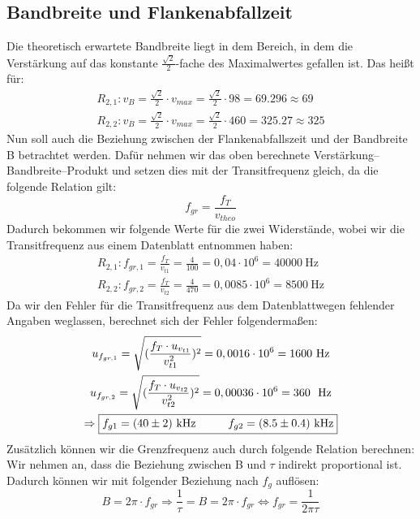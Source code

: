 \subsection*{Bandbreite und Flankenabfallzeit}
Die theoretisch erwartete Bandbreite liegt in dem Bereich, in dem die Verstärkung auf das konstante $\frac{\sqrt{2}}{2}$-fache des Maximalwertes gefallen ist. Das heißt für:
\begin{gather}
    R_{2,1}: v_B=\frac{\sqrt{2}}{2}\cdot v_{max}=\frac{\sqrt{2} }{2}\cdot 98=69.296\approx 69\\
    R_{2,2}: v_B=\frac{\sqrt{2}}{2}\cdot v_{max}=\frac{\sqrt{2}}{2}\cdot460 =325.27\approx 325
\end{gather}
Nun soll auch die Beziehung zwischen der Flankenabfallszeit und der Bandbreite B betrachtet werden. Dafür nehmen wir das oben berechnete Verstärkung–Bandbreite–Produkt und setzen dies mit der Transitfrequenz gleich, da die folgende Relation gilt:
\begin{equation}
    f_{gr}=\frac{f_T}{v_{theo}}
\end{equation}
Dadurch bekommen wir folgende Werte für die zwei Widerstände, wobei wir die Transitfrequenz aus einem Datenblatt entnommen haben:
\begin{gather}
    R_{2,1}: f_{gr,1}=\frac{f_T}{v_{t1}}=\frac{4}{100}=0,04\cdot 10^6=40000~\text{Hz}\\
    R_{2,2}: f_{gr,2}=\frac{f_T}{v_{t2}}=\frac{4}{470}=0,0085\cdot 10^6=8500~\text{Hz}
\end{gather}
Da wir den Fehler für die Transitfrequenz aus dem Datenblatt\footnotemark[1] wegen fehlender Angaben weglassen, berechnet sich der Fehler folgendermaßen:
\begin{gather}
    u_{f_{gr,1}}=\sqrt{(\frac{f_T \cdot u_{v_{t1}}}{v_{t1}^2})^2}=0,0016\cdot 10^6=1600~\text{Hz}\\
    u_{f_{gr,2}}=\sqrt{(\frac{f_T \cdot u_{v_{t2}}}{v_{t2}^2})^2}=0,00036\cdot 10^6=360~~\text{Hz}\\
    \Rightarrow \boxed{f_{g1}=(40\pm2)~\text{kHz} \hspace*{1cm} f_{g2}=(8.5\pm0.4)~\text{kHz}}
\end{gather}
Zusätzlich können wir die Grenzfrequenz auch durch folgende Relation berechnen: Wir nehmen an, dass die Beziehung zwischen B und $\tau$ indirekt proportional ist. Dadurch können wir mit folgender Beziehung nach $f_g$ auflösen:
\begin{equation}
    B=2\pi\cdot f_{gr} \Rightarrow \frac{1}{\tau}=B=2\pi\cdot f_{gr} \Leftrightarrow  f_{gr}=\frac{1}{2\pi \tau}
\end{equation}
